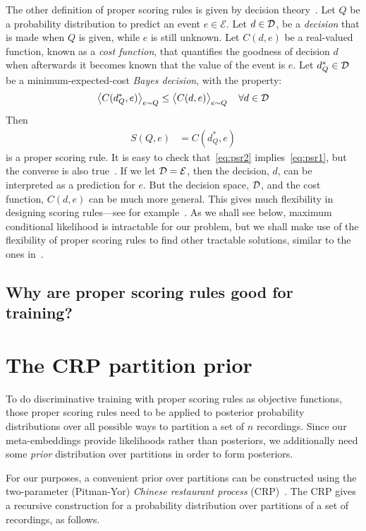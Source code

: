 \documentclass[a4paper,oneside,12pt,english]{report}
\def\expv#1#2{\bigl\langle#1\bigr\rangle_{#2}}
\def\Lset{\mathcal{L}}
\def\Eset{\mathcal{E}}
\def\Iset#1#2#3{\{#1_{#2}\}_{#2=1}^{#3}}
\begin{document}
The other definition of proper scoring rules is given by decision theory~\cite{DeGroot}. Let $Q$ be a probability distribution to predict an event $e\in\Eset$. Let $d\in\mathcal{D}$, be a \emph{decision} that is made when $Q$ is given, while $e$ is still unknown. Let $C(d,e)$ be a real-valued function, known as a \emph{cost function}, that quantifies the goodness of decision $d$ when afterwards it becomes known that the value of the event is $e$. Let $d^*_Q\in\mathcal{D}$ be a minimum-expected-cost \emph{Bayes decision}, with the property:
\begin{align}
\expv{C(d^*_Q,e)}{e\sim Q} \le \expv{C(d,e)}{e\sim Q} \;\;\;\;\forall d\in\Dset
\end{align} 
Then 
\begin{align}
\label{eq:psr2}
S(Q,e) &= C(d^*_Q,e)
\end{align}
is a proper scoring rule. It is easy to check that~\eqref{eq:psr2} implies~\eqref{eq:psr1}, but the converse is also true~\cite{PhD}. If we let $\Dset=\Eset$, then the decision, $d$, can be interpreted as a prediction for $e$. But the decision space, $\mathcal{D}$, and the cost function, $C(d,e)$ can be much more general. This gives much flexibility in designing scoring rules---see for example~\cite{Degrees_of_boosting,PhD,PW_PSR}. As we shall see below, maximum conditional likelihood is intractable for our problem, but we shall make use of the flexibility of proper scoring rules to find other tractable solutions, similar to the ones in~\cite{Dawid_Musio_ThApp_PSR_2014,Dawid_Musio_PSR_ModelSelec_2015}. 

\subsection{Why are proper scoring rules good for training? }


\section{The CRP partition prior}
\label{sec:CRP}
\def\Li{\Lset_{\setminus i}}
\def\Iset{\mathcal{I}}
To do discriminative training with proper scoring rules as objective functions, those proper scoring rules need to be applied to posterior probability distributions over all possible ways to partition a set of $n$ recordings. Since our meta-embeddings provide likelihoods rather than posteriors, we additionally need some \emph{prior} distribution over partitions in order to form posteriors. 

For our purposes, a convenient prior over partitions can be constructed using the two-parameter (Pitman-Yor) \emph{Chinese restaurant process} (CRP)~\cite{Goldwater,Pitman}. The CRP gives a recursive construction for a probability distribution over partitions of a set of  recordings, as follows. 
\end{document}
